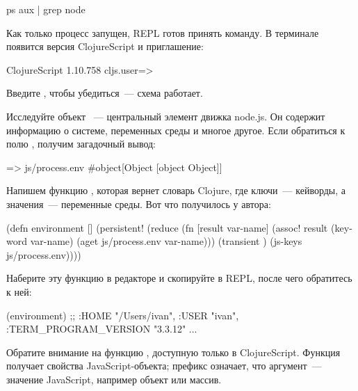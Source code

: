 \begin{english}
  \begin{bash}
ps aux | grep node
  \end{bash}
\end{english}

Как только процесс запущен, REPL готов принять команду. В терминале появится версия ClojureScript и приглашение:

\begin{english}
  \begin{text}
ClojureScript 1.10.758
cljs.user=>
  \end{text}
\end{english}

Введите , чтобы убедиться~--- схема работает.

Исследуйте объект ~--- центральный элемент движка node.js. Он содержит информацию о системе, переменных среды и многое другое. Если обратиться к полю , получим загадочный вывод:

\begin{english}
  \begin{clojure}
=> js/process.env
#object[Object [object Object]]
  \end{clojure}
\end{english}

Напишем функцию , которая вернет словарь Clojure, где ключи~--- кейворды, а значения~--- переменные среды. Вот что получилось у автора:

\begin{english}
  \begin{clojure}
(defn environment []
  (persistent!
   (reduce
    (fn [result var-name]
      (assoc! result
              (keyword var-name)
              (aget js/process.env var-name)))
    (transient {})
    (js-keys js/process.env))))
  \end{clojure}
\end{english}

Наберите эту функцию в редакторе и скопируйте в REPL, после чего обратитесь к ней:

\begin{english}
  \begin{clojure}
(environment)
;; {:HOME "/Users/ivan", :USER "ivan", :TERM_PROGRAM_VERSION "3.3.12" ...}
  \end{clojure}
\end{english}

Обратите внимание на функцию , доступную только в ClojureScript. Функция получает свойства JavaScript-объекта; префикс  означает, что аргумент~--- значение JavaScript, например объект или массив.

